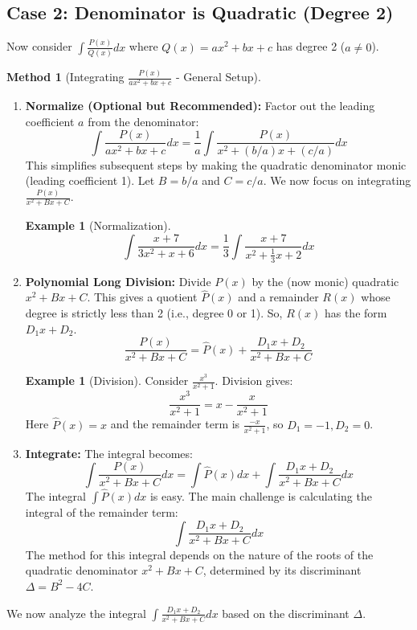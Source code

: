 \documentclass[11pt]{article}
\theoremstyle{plain}
\theoremstyle{definition}
\newtheorem{example}[theorem]{Example}
\newtheorem{method}[theorem]{Method}
\theoremstyle{remark}
\begin{document}
\subsection{Case 2: Denominator is Quadratic (Degree 2)}

Now consider $\int \frac{P(x)}{Q(x)} dx$ where $Q(x) = ax^2+bx+c$ has degree 2 ($a \neq 0$).

\begin{method}[Integrating $\frac{P(x)}{ax^2+bx+c}$ - General Setup]
\leavevmode
\begin{enumerate}
    \item \textbf{Normalize (Optional but Recommended):} Factor out the leading coefficient $a$ from the denominator:
    \[ \int \frac{P(x)}{ax^2+bx+c} dx = \frac{1}{a} \int \frac{P(x)}{x^2 + (b/a)x + (c/a)} dx \]
    This simplifies subsequent steps by making the quadratic denominator monic (leading coefficient 1). Let $B=b/a$ and $C=c/a$. We now focus on integrating $\frac{P(x)}{x^2+Bx+C}$.
    \begin{example}[Normalization]
    \[ \int \frac{x+7}{3x^2+x+6} dx = \frac{1}{3} \int \frac{x+7}{x^2 + \frac{1}{3}x + 2} dx \]
    \end{example}
    \item \textbf{Polynomial Long Division:} Divide $P(x)$ by the (now monic) quadratic $x^2+Bx+C$. This gives a quotient $\hat{P}(x)$ and a remainder $R(x)$ whose degree is strictly less than 2 (i.e., degree 0 or 1). So, $R(x)$ has the form $D_1 x + D_2$.
    \[ \frac{P(x)}{x^2+Bx+C} = \hat{P}(x) + \frac{D_1 x + D_2}{x^2+Bx+C} \]
    \begin{example}[Division]
    Consider $\frac{x^3}{x^2+1}$. Division gives:
    \[ \frac{x^3}{x^2+1} = x - \frac{x}{x^2+1} \]
    Here $\hat{P}(x) = x$ and the remainder term is $\frac{-x}{x^2+1}$, so $D_1=-1, D_2=0$.
    \end{example}
    \item \textbf{Integrate:} The integral becomes:
    \[ \int \frac{P(x)}{x^2+Bx+C} dx = \int \hat{P}(x) dx + \int \frac{D_1 x + D_2}{x^2+Bx+C} dx \]
    The integral $\int \hat{P}(x) dx$ is easy. The main challenge is calculating the integral of the remainder term:
    \[ \int \frac{D_1 x + D_2}{x^2+Bx+C} dx \]
    The method for this integral depends on the nature of the roots of the quadratic denominator $x^2+Bx+C$, determined by its discriminant $\Delta = B^2 - 4C$.
\end{enumerate}
\end{method}

We now analyze the integral $\int \frac{D_1 x + D_2}{x^2+Bx+C} dx$ based on the discriminant $\Delta$.
\end{document}
